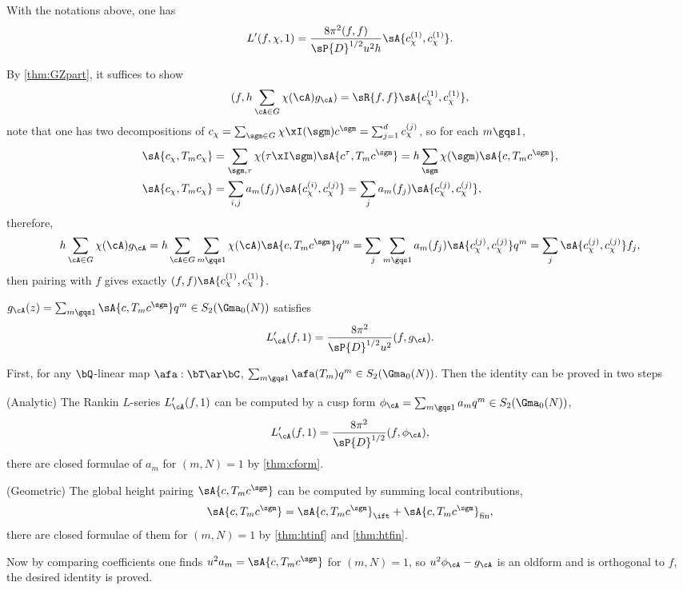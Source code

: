 \documentclass[a4paper, twoside]{article}
\begin{document}
\begin{thm}[{\cite[I.6.3]{GZ1986}}]\label{thm:GZmain}
	With the notations above, one has
	\[
		L'(f,\chi,1)=\frac{8\pi^{2}(f,f)}{\sP{D}^{1/2}u^{2}h}\sA{c_{\chi}^{(1)},c_{\chi}^{(1)}}.
	\]
\end{thm}

\begin{prf}
	By \cref{thm:GZpart}, it suffices to show
	\[
		(f,h\sum_{\cA\in G}\chi(\cA)g_{\cA})=\sR{f,f}\sA{c_{\chi}^{(1)},c_{\chi}^{(1)}},
	\]
	note that one has two decompositions of $c_{\chi}=\sum_{\sgm\in G}\chi\xI(\sgm)c^{\sgm}=\sum_{j=1}^{d}c_{\chi}^{(j)}$, so for each $m\gqs1$,
	\begin{align*}
	  \sA{c_{\chi},T_{m}c_{\chi}} &= \sum_{\sgm,\tau}\chi(\tau\xI\sgm)\sA{c^{\tau},T_{m}c^{\sgm}} =h\sum_{\sgm}\chi(\sgm)\sA{c,T_{m}c^{\sgm}},\\
	  \sA{c_{\chi},T_{m}c_{\chi}} &= \sum_{i,j}a_{m}(f_{j})\sA{c_{\chi}^{(i)},c_{\chi}^{(j)}}=\sum_{j}a_{m}(f_{j})\sA{c_{\chi}^{(j)},c_{\chi}^{(j)}},
	\end{align*}
	therefore,
	\begin{align*}
	  h\sum_{\cA\in G}\chi(\cA)g_{\cA} = h\sum_{\cA\in G}\sum_{m\gqs1}\chi(\cA)\sA{c,T_{m}c^{\sgm}}q^{m} = \sum_{j}\sum_{m\gqs1}a_{m}(f_{j})\sA{c_{\chi}^{(j)},c_{\chi}^{(j)}}q^{m} = \sum_{j}\sA{c_{\chi}^{(j)},c_{\chi}^{(j)}}f_{j},
	\end{align*}
	then pairing with $f$ gives exactly $(f,f)\sA{c_{\chi}^{(1)},c_{\chi}^{(1)}}$.
\end{prf}

\begin{thm}[{\cite[I.6.1]{GZ1986}}]\label{thm:GZpart}
	$g_{\cA}(z)=\sum_{m\gqs1}\sA{c,T_{m}c^{\sgm}}q^{m}\in S_{2}(\Gma_{0}(N))$ satisfies
	\[
		L_{\cA}'(f,1)=\frac{8\pi^{2}}{\sP{D}^{1/2}u^{2}}(f,g_{\cA}).
	\]
\end{thm}

\begin{prf}
	First, for any $\bQ$-linear map $\afa:\bT\ar \bC$, $\sum_{m\gqs1}\afa(T_{m})q^{m}\in S_{2}(\Gma_{0}(N))$. Then the identity can be proved in two steps
	\begin{enr}
		\item (Analytic) The Rankin $L$-series $L_{\cA}'(f,1)$ can be computed by a cusp form $\phi_{\cA}=\sum_{m\gqs1}a_{m}q^{m}\in S_{2}(\Gma_{0}(N))$,
		\[
			L_{\cA}'(f,1)=\frac{8\pi^{2}}{\sP{D}^{1/2}}(f,\phi_{\cA}),
		\]
		there are closed formulae of $a_{m}$ for $(m,N)=1$ by \cref{thm:cform}.
		\item (Geometric) The global height pairing $\sA{c,T_{m}c^{\sgm}}$ can be computed by summing local contributions,
		\[
			\sA{c,T_{m}c^{\sgm}}=\sA{c,T_{m}c^{\sgm}}_{\ift}+\sA{c,T_{m}c^{\sgm}}_{\text{fin}},
		\]
		there are closed formulae of them for $(m,N)=1$ by \cref{thm:htinf} and \cref{thm:htfin}.

	\end{enr}
	Now by comparing coefficients one finds $u^{2}a_{m}=\sA{c,T_{m}c^{\sgm}}$ for $(m,N)=1$, so $u^{2}\phi_{\cA}-g_{\cA}$ is an oldform and is orthogonal to $f$, the desired identity is proved.
\end{prf}
\end{document}
